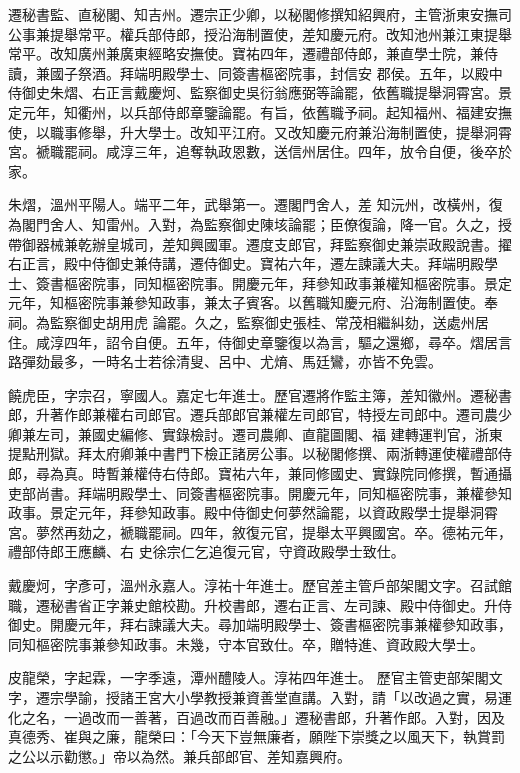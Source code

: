 \begin{pinyinscope}
 遷秘書監、直秘閣、知吉州。遷宗正少卿，以秘閣修撰知紹興府，主管浙東安撫司公事兼提舉常平。權兵部侍郎，授沿海制置使，差知慶元府。改知池州兼江東提舉常平。改知廣州兼廣東經略安撫使。寶祐四年，遷禮部侍郎，兼直學士院，兼侍讀，兼國子祭酒。拜端明殿學士、同簽書樞密院事，封信安
 郡侯。五年，以殿中侍御史朱熠、右正言戴慶炣、監察御史吳衍翁應弼等論罷，依舊職提舉洞霄宮。景定元年，知衢州，以兵部侍郎章鑒論罷。有旨，依舊職予祠。起知福州、福建安撫使，以職事修舉，升大學士。改知平江府。又改知慶元府兼沿海制置使，提舉洞霄宮。褫職罷祠。咸淳三年，追奪執政恩數，送信州居住。四年，放令自便，後卒於家。



 朱熠，溫州平陽人。端平二年，武舉第一。遷閣門舍人，差
 知沅州，改橫州，復為閣門舍人、知雷州。入對，為監察御史陳垓論罷；臣僚復論，降一官。久之，授帶御器械兼乾辦皇城司，差知興國軍。遷度支郎官，拜監察御史兼崇政殿說書。擢右正言，殿中侍御史兼侍講，遷侍御史。寶祐六年，遷左諫議大夫。拜端明殿學士、簽書樞密院事，同知樞密院事。開慶元年，拜參知政事兼權知樞密院事。景定元年，知樞密院事兼參知政事，兼太子賓客。以舊職知慶元府、沿海制置使。奉祠。為監察御史胡用虎
 論罷。久之，監察御史張桂、常茂相繼糾劾，送處州居住。咸淳四年，詔令自便。五年，侍御史章鑒復以為言，驅之還鄉，尋卒。熠居言路彈劾最多，一時名士若徐清叟、呂中、尤焴、馬廷鸞，亦皆不免雲。



 饒虎臣，字宗召，寧國人。嘉定七年進士。歷官遷將作監主簿，差知徽州。遷秘書郎，升著作郎兼權右司郎官。遷兵部郎官兼權左司郎官，特授左司郎中。遷司農少卿兼左司，兼國史編修、實錄檢討。遷司農卿、直龍圖閣、福
 建轉運判官，浙東提點刑獄。拜太府卿兼中書門下檢正諸房公事。以秘閣修撰、兩浙轉運使權禮部侍郎，尋為真。時暫兼權侍右侍郎。寶祐六年，兼同修國史、實錄院同修撰，暫通攝吏部尚書。拜端明殿學士、同簽書樞密院事。開慶元年，同知樞密院事，兼權參知政事。景定元年，拜參知政事。殿中侍御史何夢然論罷，以資政殿學士提舉洞霄宮。夢然再劾之，褫職罷祠。四年，敘復元官，提舉太平興國宮。卒。德祐元年，禮部侍郎王應麟、右
 史徐宗仁乞追復元官，守資政殿學士致仕。



 戴慶炣，字彥可，溫州永嘉人。淳祐十年進士。歷官差主管戶部架閣文字。召試館職，遷秘書省正字兼史館校勘。升校書郎，遷右正言、左司諫、殿中侍御史。升侍御史。開慶元年，拜右諫議大夫。尋加端明殿學士、簽書樞密院事兼權參知政事，同知樞密院事兼參知政事。未幾，守本官致仕。卒，贈特進、資政殿大學士。



 皮龍榮，字起霖，一字季遠，潭州醴陵人。淳祐四年進士。
 歷官主管吏部架閣文字，遷宗學諭，授諸王宮大小學教授兼資善堂直講。入對，請「以改過之實，易運化之名，一過改而一善著，百過改而百善融。」遷秘書郎，升著作郎。入對，因及真德秀、崔與之廉，龍榮曰：「今天下豈無廉者，願陛下崇獎之以風天下，執賞罰之公以示勸懲。」帝以為然。兼兵部郎官、差知嘉興府。




\end{pinyinscope}
